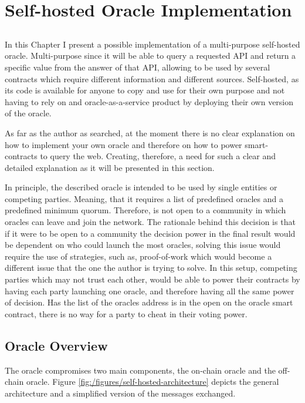 \chapter{Self-hosted Oracle Implementation} \label{chap:chap6}

\section*{}

In this Chapter I present a possible implementation of a multi-purpose self-hosted oracle. Multi-purpose since it will be able to query a requested API and return a specific value from the answer of that API, allowing to be used by several contracts which require different information and different sources. Self-hosted, as its code is available for anyone to copy and use for their own purpose and not having to rely on and oracle-as-a-service product by deploying their own version of the oracle.

As far as the author as searched, at the moment there is no clear explanation on how to implement your own oracle and therefore on how to power smart-contracts to query the web. Creating, therefore, a need for such a clear and detailed explanation as it will be presented in this section.

In principle, the described oracle is intended to be used by single entities or competing parties. Meaning, that it requires a list of predefined oracles and a predefined minimum quorum. Therefore, is not open to a community in which oracles can leave and join the network. The rationale behind this decision is that if it were to be open to a community the decision power in the final result would be dependent on who could launch the most oracles, solving this issue would require  the use of strategies, such as, proof-of-work which would become a different issue that the one the author is trying to solve.
In this setup, competing parties which may not trust each other, would be able to power their contracts by having each party launching one oracle, and therefore having all the same power of decision. Has the list of the oracles address is in the open on the oracle smart contract, there is no way for a party to cheat in their voting power.

\section{Oracle Overview}

The oracle compromises two main components, the on-chain oracle and the off-chain oracle. Figure \ref{fig:/figures/self-hosted-architecture} depicts the general architecture and a simplified version of the messages exchanged.

